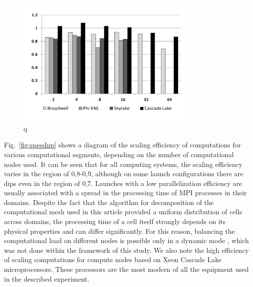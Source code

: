 \begin{figure}[ht]
\centering
\includegraphics[width=0.8\textwidth]{pics/text_2_scaling/scaling.pdf}
\caption{q}\label{fig:pic_classical_methods_multilayer}
\end{figure}

Fig.~\ref{fig:speedup} shows a diagram of the scaling efficiency of computations for various computational segments, depending on the number of computational nodes used.
It can be seen that for all computing systems, the scaling efficiency varies in the region of 0,8-0,9, although on some launch configurations there are dips even in the region of 0,7.
Launches with a low parallelization efficiency are usually associated with a spread in the processing time of MPI processes in their domains.
Despite the fact that the algorithm for decomposition of the computational mesh used in this article provided a uniform distribution of cells across domains, the processing time of a cell itself strongly depends on its physical properties and can differ significantly.
For this reason, balancing the computational load on different nodes is possible only in a dynamic mode \cite{Van_DynamicLoadBalance}, which was not done within the framework of this study.
We also note the high efficiency of scaling computations for compute nodes based on Xeon Cascade Lake microprocessors.
These processors are the most modern of all the equipment used in the described experiment.
